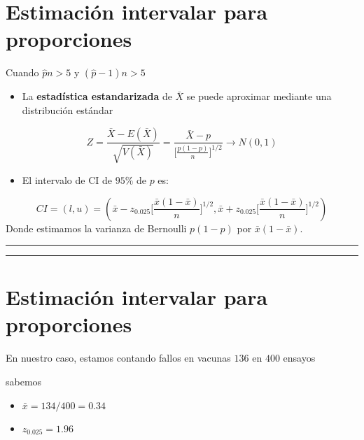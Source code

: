 \documentclass[
]{book}
\providecommand{\tightlist}{%
  \setlength{\itemsep}{0pt}\setlength{\parskip}{0pt}}
\begin{document}
\hypertarget{estimaciuxf3n-intervalar-para-proporciones-2}{%
\section{Estimación intervalar para proporciones}\label{estimaciuxf3n-intervalar-para-proporciones-2}}

Cuando \(\hat{p}n>5\) y \((\hat{p}-1)n>5\)

\begin{itemize}
\tightlist
\item
  La \textbf{estadística estandarizada} de \(\bar{X}\) se puede aproximar mediante una distribución estándar
\end{itemize}

\[Z=\frac{\bar{X}-E(\bar{X})}{\sqrt{V(\bar{X})}}= \frac{\bar{X}-p}{\big[\frac{p(1-p)}{n} \big]^{1/2}}\rightarrow N(0,1)\]

\begin{itemize}
\tightlist
\item
  El intervalo de CI de \(95\%\) de \(p\) es:
\end{itemize}

\[CI=(l,u)=(\bar{x}-z_{0.025}\big[\frac{\bar{x}(1-\bar{x})}{n} \big]^{ 1/2}, \bar{x}+z_{0.025}\big[\frac{\bar{x}(1-\bar{x})}{n} \big]^{1/2})\]
Donde estimamos la varianza de Bernoulli \(p(1-p)\) por \(\bar{x}(1-\bar{x})\).

\begin{center}\rule{0.5\linewidth}{0.5pt}\end{center}

\begin{center}\rule{0.5\linewidth}{0.5pt}\end{center}

\hypertarget{estimaciuxf3n-intervalar-para-proporciones-3}{%
\section{Estimación intervalar para proporciones}\label{estimaciuxf3n-intervalar-para-proporciones-3}}

En nuestro caso, estamos contando fallos en vacunas \(136\) en \(400\) ensayos

sabemos

\begin{itemize}
\tightlist
\item
  \(\bar{x}=134/400=0.34\)
\item
  \(z_{0.025}=1.96\)
\end{itemize}
\end{document}
